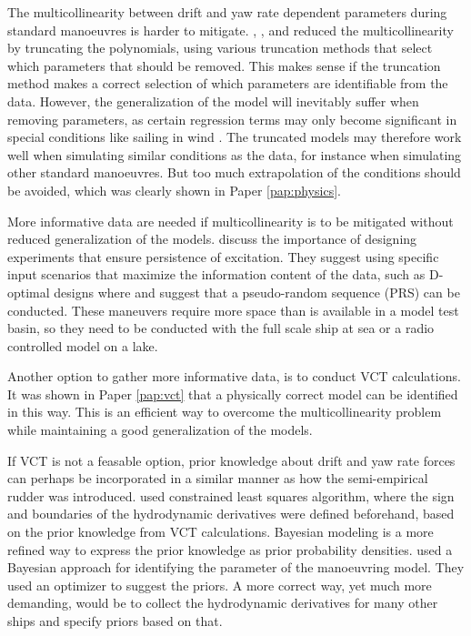The multicollinearity between drift and yaw rate dependent parameters during standard manoeuvres is harder to mitigate. \textcite{abkowitzMEASUREMENTHYDRODYNAMICCHARACTERISTICS1980},  \textcite{xuUncertaintyAnalysisHydrodynamic2019}, and \textcite{liuPhysicsinformedIdentificationMarine2024} reduced the multicollinearity by  truncating the polynomials, using various truncation methods that select which parameters that should be removed. This makes sense if the truncation method makes a correct selection of which parameters are identifiable from the data. However, the generalization of the model will inevitably suffer when removing parameters, as certain regression terms may only become significant in special conditions like sailing in wind \cite{abkowitzMEASUREMENTHYDRODYNAMICCHARACTERISTICS1980}. The truncated models may therefore work well when simulating similar conditions as the data, for instance when simulating other standard manoeuvres. But too much extrapolation of the conditions should be avoided, which was clearly shown in Paper \ref{pap:physics}. 

More informative data are needed if multicollinearity is to be mitigated without reduced generalization of the models. \textcite{yoonIdentificationHydrodynamicCoefficients2003} discuss the importance of designing experiments that ensure persistence of excitation. They suggest using specific input scenarios that maximize the information content of the data, such as D-optimal designs where \textcite{wangOptimalDesignExcitation2020} and \textcite{millerShipModelIdentification2021} suggest that a pseudo-random sequence (PRS) can be conducted. These
maneuvers require more space than is available in a model test basin, so they need to be conducted with the full scale ship at sea or a radio controlled model on a lake.

Another option to gather more informative data, is to conduct VCT calculations. It was shown in Paper \ref{pap:vct} that a physically correct model can be identified in this way. This is an efficient way to overcome the multicollinearity problem while maintaining a good generalization of the models. 

If VCT is not a feasable option, prior knowledge about drift and yaw rate forces can perhaps be incorporated in a similar manner as how the semi-empirical rudder was introduced. \textcite{chillcceDatadrivenSystemIdentification2023} used constrained least squares algorithm, where the sign and boundaries of the hydrodynamic derivatives were defined beforehand, based on the prior knowledge from VCT calculations. Bayesian modeling is a more refined way to express the prior knowledge as prior probability densities. \textcite{xueHydrodynamicParameterIdentification2020} used a Bayesian approach for identifying the parameter of the manoeuvring model. They used an optimizer to suggest the priors. A more correct way, yet much more demanding, would be to collect the hydrodynamic derivatives for many other ships and specify priors based on that. \textcite{}

